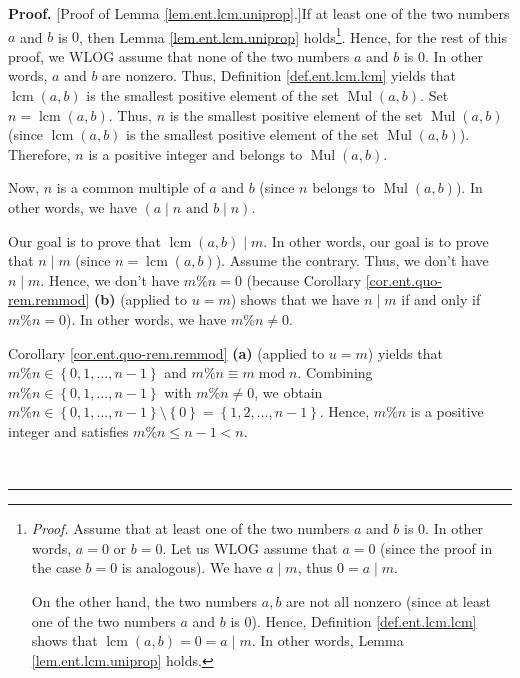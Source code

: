 \documentclass[numbers=enddot,12pt,final,onecolumn,notitlepage]{scrartcl}%
\numberwithin{exer}{subsection}
\theoremstyle{definition}
\newenvironment{proof}[1][Proof]{\noindent\textbf{#1.} }{\ \rule{0.5em}{0.5em}}
\begin{document}
\begin{proof}
[Proof of Lemma \ref{lem.ent.lcm.uniprop}.]If at least one of the two numbers
$a$ and $b$ is $0$, then Lemma \ref{lem.ent.lcm.uniprop}
holds\footnote{\textit{Proof.} Assume that at least one of the two numbers $a$
and $b$ is $0$. In other words, $a=0$ or $b=0$. Let us WLOG assume that $a=0$
(since the proof in the case $b=0$ is analogous). We have $a\mid m$, thus
$0=a\mid m$.
\par
On the other hand, the two numbers $a,b$ are not all nonzero (since at least
one of the two numbers $a$ and $b$ is $0$). Hence, Definition
\ref{def.ent.lcm.lcm} shows that $\operatorname{lcm}\left(  a,b\right)
=0=a\mid m$. In other words, Lemma \ref{lem.ent.lcm.uniprop} holds.}. Hence,
for the rest of this proof, we WLOG assume that none of the two numbers $a$
and $b$ is $0$. In other words, $a$ and $b$ are nonzero. Thus, Definition
\ref{def.ent.lcm.lcm} yields that $\operatorname{lcm}\left(  a,b\right)  $ is
the smallest positive element of the set $\operatorname*{Mul}\left(
a,b\right)  $. Set $n=\operatorname{lcm}\left(  a,b\right)  $. Thus, $n$ is
the smallest positive element of the set $\operatorname*{Mul}\left(
a,b\right)  $ (since $\operatorname{lcm}\left(  a,b\right)  $ is the smallest
positive element of the set $\operatorname*{Mul}\left(  a,b\right)  $).
Therefore, $n$ is a positive integer and belongs to $\operatorname*{Mul}%
\left(  a,b\right)  $.

Now, $n$ is a common multiple of $a$ and $b$ (since $n$ belongs to
$\operatorname*{Mul}\left(  a,b\right)  $). In other words, we have $\left(
a\mid n\text{ and }b\mid n\right)  $.

Our goal is to prove that $\operatorname{lcm}\left(  a,b\right)  \mid m$. In
other words, our goal is to prove that $n\mid m$ (since $n=\operatorname{lcm}%
\left(  a,b\right)  $). Assume the contrary. Thus, we don't have $n\mid m$.
Hence, we don't have $m\%n=0$ (because Corollary \ref{cor.ent.quo-rem.remmod}
\textbf{(b)} (applied to $u=m$) shows that we have $n\mid m$ if and only if
$m\%n=0$). In other words, we have $m\%n\neq0$.

Corollary \ref{cor.ent.quo-rem.remmod} \textbf{(a)} (applied to $u=m$) yields
that $m\%n\in\left\{  0,1,\ldots,n-1\right\}  $ and $m\%n\equiv
m\operatorname{mod}n$. Combining $m\%n\in\left\{  0,1,\ldots,n-1\right\}  $
with $m\%n\neq0$, we obtain $m\%n\in\left\{  0,1,\ldots,n-1\right\}
\setminus\left\{  0\right\}  =\left\{  1,2,\ldots,n-1\right\}  $. Hence,
$m\%n$ is a positive integer and satisfies $m\%n\leq n-1<n$.


\end{proof}
\end{document}
